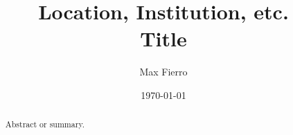 \documentclass{tufte-handout}
\title{	
	\normalfont\normalsize 
	{Location, Institution, etc.} \\ [0pt] %
	\huge Title
}\author{Max Fierro}
\date{\vspace{-5pt}\normalsize \today}
\theoremstyle{definition}
\theoremstyle{remark}
\begin{document}
\justifying 
\maketitle
\begin{abstract}
	Abstract or summary.
\end{abstract}
\tableofcontents
\end{document}
